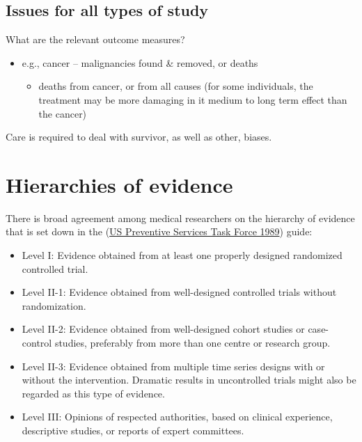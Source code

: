 \documentclass[
  10pt,
  b5paper]{book}
\providecommand{\tightlist}{%
  \setlength{\itemsep}{0pt}\setlength{\parskip}{0pt}}
\begin{document}
\hypertarget{issues-for-all-types-of-study}{%
\subsection*{Issues for all types of study}\label{issues-for-all-types-of-study}}

What are the relevant outcome measures?

\begin{itemize}
\tightlist
\item
  e.g., cancer -- malignancies found \& removed, or deaths

  \begin{itemize}
  \tightlist
  \item
    deaths from cancer, or from all causes (for some individuals,
    the treatment may be more damaging in it medium to long term effect
    than the cancer)
  \end{itemize}
\end{itemize}

Care is required to deal with survivor, as well as other, biases.

\hypertarget{hierarchies-of-evidence}{%
\section{Hierarchies of evidence}\label{hierarchies-of-evidence}}

There is broad agreement among medical researchers on the
hierarchy of evidence that is set down in the (\protect\hyperlink{ref-us1989guide}{US Preventive Services Task Force 1989})
guide:

\begin{itemize}
\tightlist
\item
  Level I: Evidence obtained from at least one properly designed randomized controlled trial.
\item
  Level II-1: Evidence obtained from well-designed controlled trials without randomization.
\item
  Level II-2: Evidence obtained from well-designed cohort studies or case-control studies, preferably from more than one centre or research group.
\item
  Level II-3: Evidence obtained from multiple time series designs with or without the intervention. Dramatic results in uncontrolled trials might also be regarded as this type of evidence.
\item
  Level III: Opinions of respected authorities, based on clinical experience, descriptive studies, or reports of expert committees.
\end{itemize}
\end{document}
